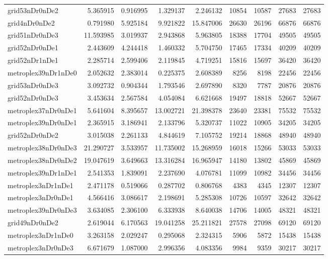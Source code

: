\begin{longtable}{|l|r|r|r|r|r|r|r|r|}
grid53nDr0nDe2 & 5.365915 & 0.916995 & 1.329137 & 2.246132 & 10854 & 10587 & 27683 & 27683 \\
grid4nDr0nDe2 & 0.791980 & 5.925184 & 9.921822 & 15.847006 & 26630 & 26196 & 66876 & 66876 \\
grid51nDr0nDe3 & 11.593985 & 3.019937 & 2.943868 & 5.963805 & 18388 & 17704 & 49505 & 49505 \\
grid52nDr0nDe1 & 2.443609 & 4.244418 & 1.460332 & 5.704750 & 17465 & 17334 & 40209 & 40209 \\
grid52nDr1nDe1 & 2.285714 & 2.599406 & 2.119845 & 4.719251 & 15816 & 15697 & 36420 & 36420 \\
metroplex39nDr1nDe0 & 2.052632 & 2.383014 & 0.225375 & 2.608389 & 8256 & 8198 & 22456 & 22456 \\
grid53nDr0nDe3 & 3.092732 & 0.904344 & 1.793546 & 2.697890 & 8320 & 7787 & 20876 & 20876 \\
grid52nDr0nDe3 & 3.453634 & 2.567584 & 4.054084 & 6.621668 & 19497 & 18818 & 52667 & 52667 \\
metroplex37nDr0nDe1 & 5.641604 & 8.395657 & 13.002721 & 21.398378 & 23640 & 23381 & 75532 & 75532 \\
metroplex39nDr0nDe1 & 2.365915 & 3.186941 & 2.133796 & 5.320737 & 11022 & 10905 & 34205 & 34205 \\
grid52nDr0nDe2 & 3.015038 & 2.261133 & 4.844619 & 7.105752 & 19214 & 18868 & 48940 & 48940 \\
metroplex38nDr0nDe3 & 21.290727 & 3.533957 & 11.735002 & 15.268959 & 16018 & 15266 & 53033 & 53033 \\
metroplex38nDr0nDe2 & 19.047619 & 3.649663 & 13.316284 & 16.965947 & 14180 & 13802 & 45869 & 45869 \\
metroplex39nDr1nDe1 & 2.541353 & 1.839091 & 2.237690 & 4.076781 & 11099 & 10982 & 34456 & 34456 \\
metroplex3nDr1nDe1 & 2.471178 & 0.519066 & 0.287702 & 0.806768 & 4383 & 4345 & 12307 & 12307 \\
metroplex3nDr0nDe1 & 4.566416 & 3.086617 & 2.198691 & 5.285308 & 10726 & 10597 & 32642 & 32642 \\
metroplex39nDr0nDe3 & 3.634085 & 2.306100 & 6.333938 & 8.640038 & 14706 & 14005 & 48321 & 48321 \\
grid49nDr0nDe2 & 2.619044 & 6.170563 & 19.041258 & 25.211821 & 27578 & 27098 & 69120 & 69120 \\
metroplex3nDr1nDe0 & 3.263158 & 2.029247 & 0.295068 & 2.324315 & 5906 & 5872 & 15438 & 15438 \\
metroplex3nDr0nDe3 & 6.671679 & 1.087000 & 2.996356 & 4.083356 & 9984 & 9359 & 30217 & 30217 \\

\end{longtable}
